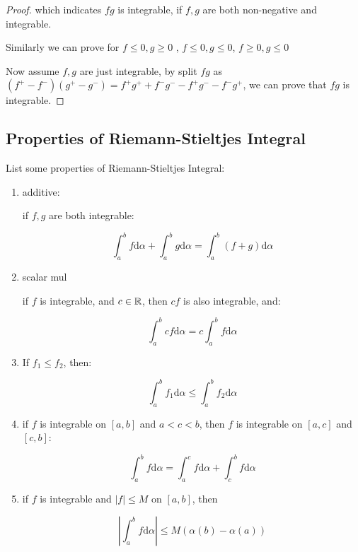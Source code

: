 \begin{proof}
    which indicates $fg$ is integrable, if $f,g$ are both non-negative and integrable.

    Similarly we can prove for $f \le 0, g \ge 0$ , $f \le 0, g \le 0$, $f \ge 0, g \le 0$

    Now assume $f,g$ are just integrable, by split $fg$ as $(f^+ - f^-)(g^+ - g^-) = f^+g^+ + f^-g^- - f^+g^- -f^-g^+$,
    we can prove that $fg$ is integrable.
\end{proof}

\subsection{Properties of Riemann-Stieltjes Integral}

\begin{thm}
    List some properties of Riemann-Stieltjes Integral:

    \begin{enumerate}
        \item additive:
        
        if $f,g$ are both integrable:
        
        \[
            \int_a^b f \mathrm{d} \alpha + \int_a^b g \mathrm{d} \alpha = \int_a^b \left( f+g\right) \mathrm{d} \alpha
        \]

        \item scalar mul
        
        if $f$ is integrable, and $c \in \mathbb{R}$, then $cf$ is also integrable, and:

        \[
            \int_a^b cf \mathrm{d} \alpha = c \int_a^b f \mathrm{d} \alpha
        \]

        \item If $f_1 \le f_2$, then:
        
        \[
           \int_a^b f_1 \mathrm{d} \alpha \le \int_a^b f_2 \mathrm{d} \alpha
        \]

        \item if $f$ is integrable on $[a,b]$ and $a < c <b$, then $f$ is integrable on $[a,c]$ and $[c,b]$:
       
        \[
            \int_a^b f \mathrm{d} \alpha = \int_a^c f \mathrm{d} \alpha + \int_c^b f \mathrm{d} \alpha
        \]

        \item if $f$ is integrable and $|f| \le M$ on $[a,b]$, then

        \[
            \left| \int_{a}^b f \mathrm{d} \alpha \right| \le M(\alpha(b) - \alpha(a))
        \]


\end{enumerate}
\end{thm}
